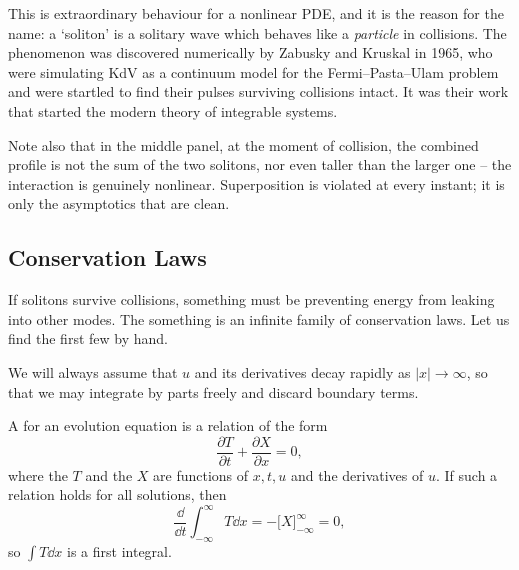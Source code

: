 \documentclass[a4paper]{scrartcl}
\begin{document}
This is extraordinary behaviour for a nonlinear PDE, and it is the reason for the name: a `soliton' is a solitary wave which behaves like a \emph{particle} in collisions. The phenomenon was discovered numerically by Zabusky and Kruskal in 1965, who were simulating KdV as a continuum model for the Fermi--Pasta--Ulam problem and were startled to find their pulses surviving collisions intact. It was their work that started the modern theory of integrable systems.

Note also that in the middle panel, at the moment of collision, the combined profile is not the sum of the two solitons, nor even taller than the larger one -- the interaction is genuinely nonlinear. Superposition is violated at every instant; it is only the asymptotics that are clean.

\subsection{Conservation Laws}

If solitons survive collisions, something must be preventing energy from leaking into other modes. The something is an infinite family of conservation laws. Let us find the first few by hand.

We will always assume that $u$ and its derivatives decay rapidly as $|x|\to\infty$, so that we may integrate by parts freely and discard boundary terms.

\begin{definition}
	A  for an evolution equation is a relation of the form
	$$
	\frac{\partial T}{\partial t} + \frac{\partial X}{\partial x} = 0,
	$$
	where the  $T$ and the  $X$ are functions of $x, t, u$ and the derivatives of $u$. If such a relation holds for all solutions, then
	$$
	\frac{\dd}{\dd t}\int_{-\infty}^\infty T\dd x = -\Big[X\Big]_{-\infty}^\infty = 0,
	$$
	so $\int T \dd x$ is a first integral.
\end{definition}
\end{document}
